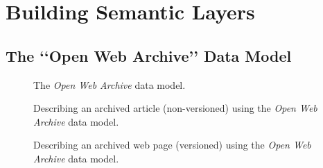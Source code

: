 \documentclass[twocolumn]{svjour3}
\newcommand{\q}[1]{\lq\lq{}{}#1\rq\rq{}{}}
\begin{document}
\section{Building Semantic Layers}
\label{sec:constrSemLayers}

\subsection{The \q{Open Web Archive} Data Model}
\label{subsec:semanticmodel}


\begin{figure}
\centering
{}
\vspace{-1mm}
\caption{The {\em Open Web Archive} data model.}
\label{fig:owa}

\vspace{5mm}

\centering
{}
\vspace{-1mm}
\caption{Describing an archived article (non-versioned) using the {\em Open Web Archive} data model.}
\label{fig:owa_instNonVers}

\vspace{5mm}

\centering
{}
\vspace{-1mm}
\caption{Describing an archived web page (versioned) using the {\em Open Web Archive} data model.}
\label{fig:owa_inst}
\end{figure}
\end{document}
